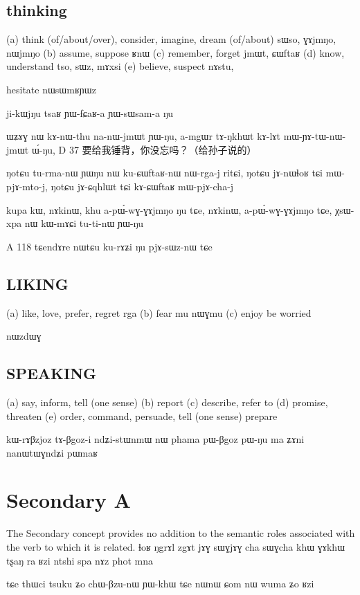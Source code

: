 \documentclass[oldfontcommands,oneside,a4paper,11pt]{article}
\begin{document}
  \subsection{thinking} 	

(a) think (of/about/over), consider, imagine, dream (of/about)
sɯso, ɣɤjmŋo, nɯjmŋo
(b) assume, suppose ʁnɯ
(c) remember, forget jmɯt, ɕɯftaʁ
(d) know, understand tso, sɯz, mɤxsi
(e) believe, suspect nɤstu, 

hesitate nɯsɯmʁɲɯz

ji-kɯjŋu tsaʁ ɲɯ-fɕaʁ-a ɲɯ-sɯsam-a ŋu


ɯʑɤɣ nɯ kɤ-nɯ-thu na-nɯ-jmɯt ɲɯ-ŋu,
a-mgɯr	tɤ-ŋkhɯt	kɤ-lɤt	mɯ-ɲɤ-tɯ-nɯ-jmɯt	ɯ́-ŋu,
D	37	要给我锤背，你没忘吗？（给孙子说的）


ŋotɕu tu-rma-nɯ ɲɯŋu nɯ ku-ɕɯftaʁ-nɯ
nɯ-rga-j ritɕi, ŋotɕu jɤ-nɯɬoʁ tɕi mɯ-pjɤ-mto-j,
ŋotɕu jɤ-ɕqhlɯt tɕi kɤ-ɕɯftaʁ mɯ-pjɤ-cha-j

kupa kɯ, nɤkinɯ, khu a-pɯ́-wɣ-ɣɤjmŋo ŋu tɕe, nɤkinɯ,
a-pɯ́-wɣ-ɣɤjmŋo tɕe, χsɯ-xpa nɯ kɯ-mɤɕi tu-ti-nɯ ɲɯ-ŋu

A 118 tɕendɤre nɯtɕu ku-rɤʑi ŋu pjɤ-sɯz-nɯ tɕe
  \subsection{LIKING} 

(a) like, love, prefer, regret
rga
(b) fear
mu nɯɣmu
(c) enjoy
be worried 

nɯzdɯɣ


  \subsection{SPEAKING} 
  
  
(a) say, inform, tell (one sense)
(b) report
(c) describe, refer to
(d) promise, threaten
(e) order, command, persuade, tell (one sense)
 prepare

kɯ-rɤβzjoz tɤ-βgoz-i
 ndʑi-stɯnmɯ nɯ phama pɯ-βgoz pɯ-ŋu ma ʑɤni nanɯtɯɣndʑi pɯmaʁ
 
 
 \section{Secondary A} 
  The Secondary concept provides no addition to the semantic roles associated with the verb to which it is related.
 ɬoʁ
ŋgrɤl
zgɤt
jɤɣ sɯɣjɤɣ
cha sɯɣcha
khɯ ɣɤkhɯ
tʂaŋ
ra
ʁzi
ntshi
spa
nɤz
phot
mna

tɕe thɯci tsuku ʑo chɯ-βzu-nɯ ɲɯ-khɯ
tɕe nɯnɯ ɕom nɯ wuma ʑo ʁzi
\end{document}
